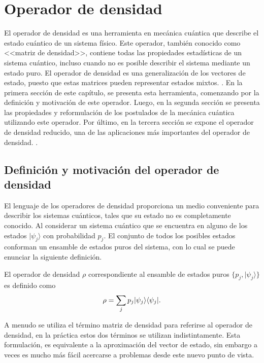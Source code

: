 \chapter{Operador de densidad}\label{OpDensidad}
El operador de densidad es una herramienta en mecánica cuántica que describe el
estado cuántico de un sistema físico. Este operador, también conocido como
<<matriz de densidad>>, contiene todas las propiedades estadísticas de un sistema cuántico, incluso cuando no es posible describir el sistema mediante un estado puro. El operador de densidad es una generalización de los vectores de estado, puesto que estas matrices pueden representar estados mixtos. .  
En la primera sección de este capítulo, se presenta esta herramienta, comenzando por la definición y motivación de este operador. Luego, en la segunda sección  se presenta las propiedades y reformulación de los postulados de la mecánica cuántica utilizando este operador. Por último, en la tercera sección se expone el operador de densidad reducido, una de las aplicaciones más importantes del operador de densidad.
. 


\section{Definición y motivación  del operador de densidad} %
El lenguaje de los operadores de densidad proporciona un  medio conveniente
para describir los sistemas cuánticos, tales que su estado no es completamente
conocido. Al considerar un sistema cuántico que se encuentra en alguno de los
estados $|\psi_j \rangle $ con probabilidad $p_j$. El conjunto de todos los
posibles estados conforman un ensamble de estados puros del sistema, con lo
cual se puede enunciar la siguiente definición. 

\begin{definition} El operador de densidad
$\rho$ correspondiente al ensamble de estados puros $\{p_j,|\psi_j \rangle \}$
es definido como {\cite{wilde2011classical}}
  	\begin{equation}{\label{defdensityoperator}}
  		\rho=\sum_{j}p_j|\psi_j\rangle \langle \psi_j|.
  	\end{equation}
\end{definition}
A menudo se utiliza el término matriz de densidad para referirse al operador de
densidad, en la práctica estos dos términos se utilizan indistintamente. Esta
formulación, es equivalente a la aproximación del vector de estado, sin embargo
a veces es mucho más fácil acercarse a problemas desde este nuevo punto de
vista.
 
